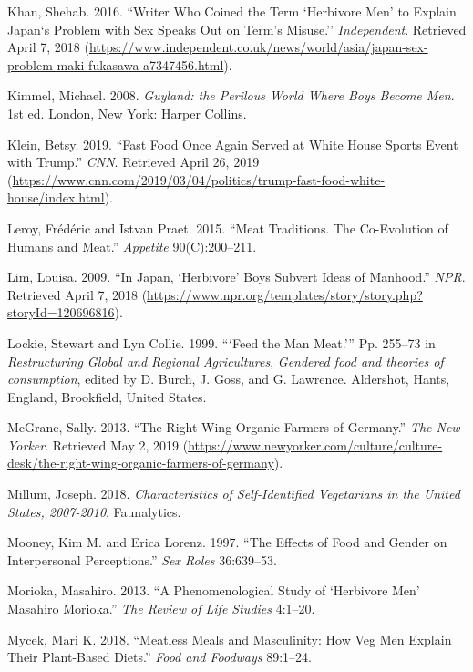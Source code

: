 \documentclass[twoside]{report}
\begin{document}
\hypertarget{khan}{Khan, Shehab. 2016. ``Writer Who Coined the Term `Herbivore Men' to Explain Japan`s Problem with Sex Speaks Out on Term's Misuse.'' \emph{Independent}. Retrieved April 7, 2018 (\url{https://www.independent.co.uk/news/world/asia/japan-sex-problem-maki-fukasawa-a7347456.html}).}

\hypertarget{kimmel}{Kimmel, Michael. 2008. \emph{Guyland: the Perilous World Where Boys Become Men}. 1st ed. London, New York: Harper Collins.}

\hypertarget{klein}{Klein, Betsy. 2019. ``Fast Food Once Again Served at White House Sports Event with Trump.'' \emph{CNN}. Retrieved April 26, 2019 (\url{https://www.cnn.com/2019/03/04/politics/trump-fast-food-white-house/index.html}).}

\hypertarget{leroy}{Leroy, Frédéric and Istvan Praet. 2015. ``Meat Traditions. The Co-Evolution of Humans and Meat.'' \emph{Appetite} 90(C):200--211.}

\hypertarget{lim}{Lim, Louisa. 2009. ``In Japan, `Herbivore' Boys Subvert Ideas of Manhood.'' \emph{NPR}. Retrieved April 7, 2018 (\url{https://www.npr.org/templates/story/story.php?storyId=120696816}).}

\hypertarget{lockie}{Lockie, Stewart and Lyn Collie. 1999. ```Feed the Man Meat.''' Pp. 255--73 in \emph{Restructuring Global and Regional Agricultures}, \emph{Gendered food and theories of consumption}, edited by D. Burch, J. Goss, and G. Lawrence. Aldershot, Hants, England, Brookfield, United States.}

\hypertarget{mcgrane}{McGrane, Sally. 2013. ``The Right-Wing Organic Farmers of Germany.'' \emph{The New Yorker}. Retrieved May 2, 2019 (\url{https://www.newyorker.com/culture/culture-desk/the-right-wing-organic-farmers-of-germany}).}

\hypertarget{millum}{Millum, Joseph. 2018. \emph{Characteristics of Self-Identified Vegetarians in the United States, 2007-2010}. Faunalytics.}
\pagebreak

\hypertarget{mooney}{Mooney, Kim M. and Erica Lorenz. 1997. ``The Effects of Food and Gender on Interpersonal Perceptions.'' \emph{Sex Roles} 36:639--53.}

\hypertarget{morioka}{Morioka, Masahiro. 2013. ``A Phenomenological Study of `Herbivore Men' Masahiro Morioka.'' \emph{The Review of Life Studies} 4:1--20.}

\hypertarget{mycek}{Mycek, Mari K. 2018. ``Meatless Meals and Masculinity: How Veg Men Explain Their Plant-Based Diets.'' \emph{Food and Foodways} 89:1--24.}
\end{document}
